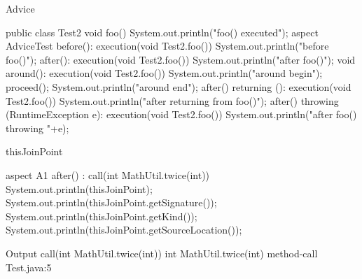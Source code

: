 \begin{frame}[fragile]{Advice}
	\begin{mycolumns}[widths={38,62},animation=none]
	\mynextcolumn
{\small
\begin{codetight}{}
public class Test2 {
	void foo() {
		System.out.println("foo() executed");
	}
}
aspect AdviceTest {
	before(): execution(void Test2.foo()) {
		System.out.println("before foo()");
	}
	after(): execution(void Test2.foo()) {
		System.out.println("after foo()");
	}
	void around(): execution(void Test2.foo()) {
		System.out.println("around begin");
		proceed();
		System.out.println("around end");
	}
	after() returning (): execution(void Test2.foo()) {
		System.out.println("after returning from foo()");
	}
	after() throwing (RuntimeException e): execution(void Test2.foo()) {
		System.out.println("after foo() throwing "+e);
	}
}
\end{codetight}
}
	\end{mycolumns}
\end{frame}

\begin{frame}[fragile]{thisJoinPoint}
	\begin{mycolumns}[widths={30,70},animation=none]
	\mynextcolumn
\begin{codetight}{}
aspect A1 {
	after() : call(int MathUtil.twice(int)) {
		System.out.println(thisJoinPoint);
		System.out.println(thisJoinPoint.getSignature());
		System.out.println(thisJoinPoint.getKind());
		System.out.println(thisJoinPoint.getSourceLocation());
	}
}
\end{codetight}
\begin{codetight}{Output}
call(int MathUtil.twice(int))
int MathUtil.twice(int)
method-call
Test.java:5
\end{codetight}
	\end{mycolumns}
\end{frame}

